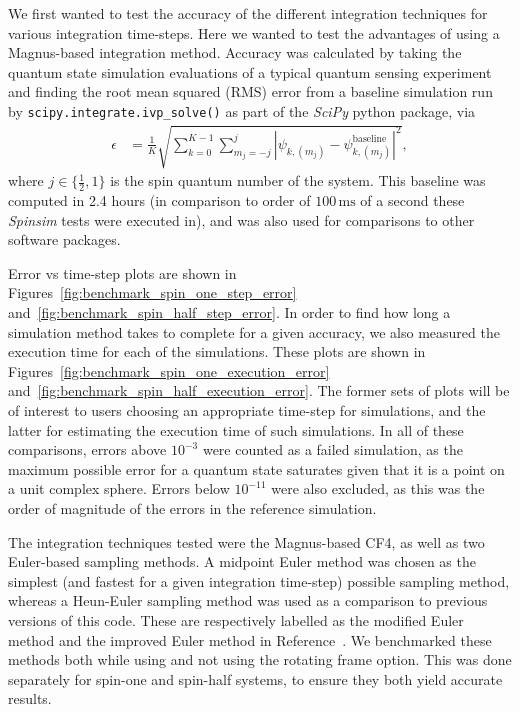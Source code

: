 \documentclass{jors}
\begin{document}
		We first wanted to test the accuracy of the different integration techniques for various integration time-steps.
		Here we wanted to test the advantages of using a Magnus-based integration method.
		Accuracy was calculated by taking the quantum state simulation evaluations of a typical quantum sensing experiment and finding the root mean squared (RMS) error from a baseline simulation run by \texttt{scipy.integrate.ivp\_solve()} as part of the \emph{SciPy} python package, via
		\begin{align}
			\epsilon &= \frac{1}{K}\sqrt{\sum_{k = 0}^{K - 1}\sum_{m_j = -j}^j|\psi_{k, (m_j)} - \psi_{k, (m_j)}^{\textrm{baseline}}|^2},\label{eq:error}
		\end{align}
		where $ j \in \{\frac12, 1\} $ is the spin quantum number of the system.
		This baseline was computed in 2.4 hours (in comparison to order of $ 100\,\mathrm{ms} $ of a second these \emph{Spinsim} tests were executed in), and was also used for comparisons to other software packages.

		Error vs time-step plots are shown in Figures~\ref{fig:benchmark_spin_one_step_error} and~\ref{fig:benchmark_spin_half_step_error}.
		In order to find how long a simulation method takes to complete for a given accuracy, we also measured the execution time for each of the simulations.
		These plots are shown in Figures~\ref{fig:benchmark_spin_one_execution_error} and~\ref{fig:benchmark_spin_half_execution_error}.
		The former sets of plots will be of interest to users choosing an appropriate time-step for simulations, and the latter for estimating the execution time of such simulations.
		In all of these comparisons, errors above $ 10^{-3} $ were counted as a failed simulation, as the maximum possible error for a quantum state saturates given that it is a point on a unit complex sphere.
		Errors below $ 10^{-11} $ were also excluded, as this was the order of magnitude of the errors in the reference simulation.

		The integration techniques tested were the Magnus-based CF4, as well as two Euler-based sampling methods.
		A midpoint Euler method was chosen as the simplest (and fastest for a given integration time-step) possible sampling method, whereas a Heun-Euler sampling method was used as a comparison to previous versions of this code.
		These are respectively labelled as the modified Euler method and the improved Euler method in Reference~\cite[p328]{suli_introduction_2003}.
		We benchmarked these methods both while using and not using the rotating frame option.
		This was done separately for spin-one and spin-half systems, to ensure they both yield accurate results.
\end{document}
